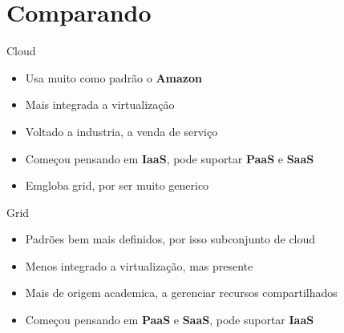 \documentclass[10pt]{beamer}
\begin{document}
\section{Comparando}
	\begin{frame}%
	\begin{block}{Cloud}
		\begin{itemize}%
			\item Usa muito como padrão o \textbf{Amazon}
			\item Mais integrada a virtualização
			\item Voltado a industria, a venda de serviço
			\item Começou pensando em \textbf{IaaS}, pode suportar \textbf{PaaS} e \textbf{SaaS}
			\item Emgloba grid, por ser muito generico
		\end{itemize}
	\end{block}

	\begin{block}{Grid}
		\begin{itemize}%
			\item Padrões bem mais definidos, por isso subconjunto de cloud
			\item Menos integrado a virtualização, mas presente
			\item Mais de origem academica, a gerenciar recursos compartilhados
			\item Começou pensando em \textbf{PaaS} e \textbf{SaaS}, pode suportar \textbf{IaaS}
		\end{itemize}
	\end{block}
	\end{frame}
\end{document}
